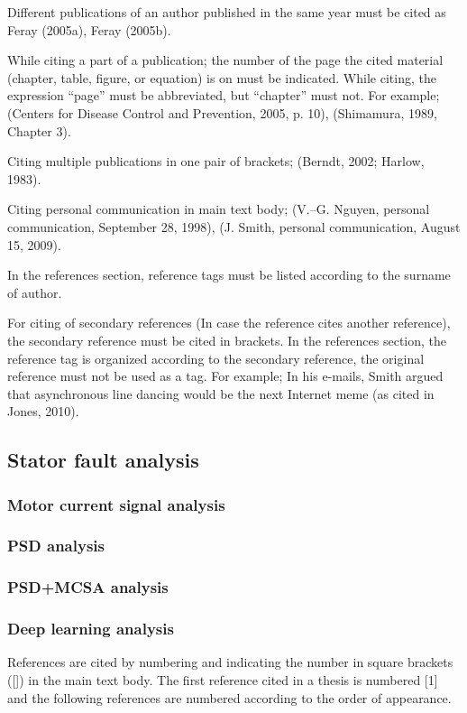 Different publications of an author published in the same year must be cited as Feray (2005a), Feray (2005b). 

While citing a part of a publication; the number of the page the cited material (chapter, table, figure, or equation) is on must be indicated. While citing, the expression “page” must be abbreviated, but “chapter” must not. For example; (Centers for Disease Control and Prevention, 2005, p. 10), (Shimamura, 1989, Chapter 3). 

Citing multiple publications in one pair of brackets; (Berndt, 2002; Harlow, 1983). 

Citing personal communication in main text body; (V.–G. Nguyen, personal communication, September 28, 1998), (J. Smith, personal communication, August 15, 2009).

In the references section, reference tags must be listed according to the surname of author. 

For citing of secondary references (In case the reference cites another reference), the secondary reference must be cited in brackets.  In the references section, the reference tag is organized according to the secondary reference, the original reference must not be used as a tag. For example; In his e-mails, Smith argued that asynchronous line dancing would be the next Internet meme (as cited in Jones, 2010).

\subsection{Stator fault analysis}
\subsubsection{Motor current signal analysis}
\subsubsection{PSD analysis}
\subsubsection{PSD+MCSA analysis}
\subsubsection{Deep learning analysis}

References are cited by numbering and indicating the number in square brackets ([]) in the main text body. The first reference cited in a thesis is numbered [1] and the following references are numbered according to the order of appearance. 

